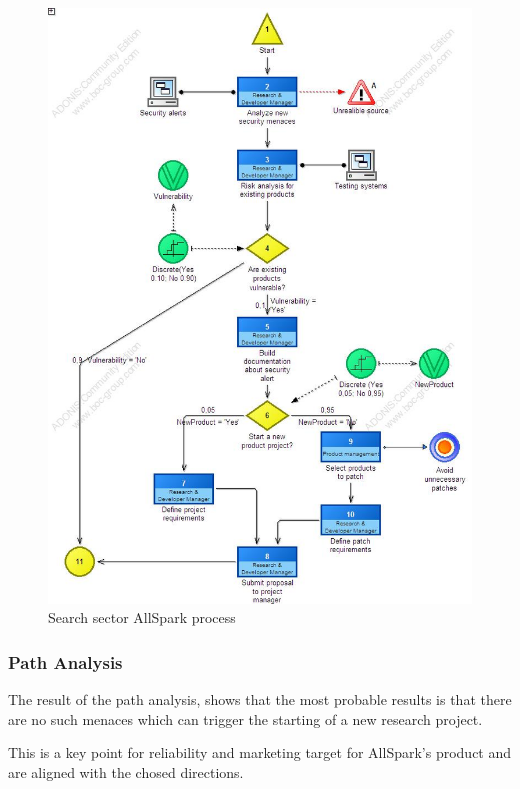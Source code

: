 \begin{figure}[!ht]
\begin{centering}
\includegraphics[scale=0.50]{assign2/adonis/imgs/sector.jpg}
\caption{Search sector AllSpark process}
\label{2img:sector}
\end{centering}
\end{figure}

\subsubsection{Path Analysis}
The result of the path analysis, shows that the most probable results is
that there are no such menaces which can trigger the starting of a new
research project.

This is a key point for reliability and marketing target for AllSpark's product and are aligned with the chosed directions.

